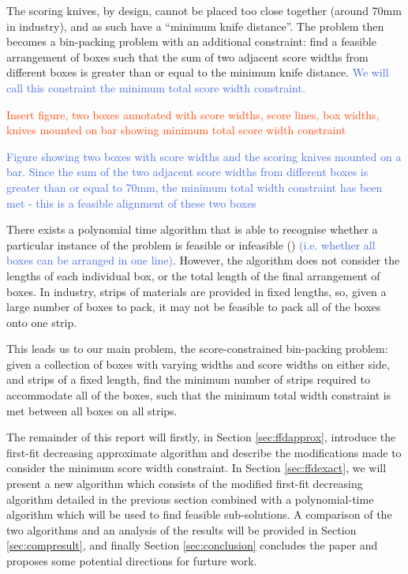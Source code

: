 \documentclass[oribibl]{llncs}
\begin{document}
The scoring knives, by design, cannot be placed too close together (around 70mm in industry), and as such have a ``minimum knife distance''. The problem then becomes a bin-packing problem with an additional constraint: find a feasible arrangement of boxes such that the sum of two adjacent score widths from different boxes is greater than or equal to the minimum knife distance. \textcolor{RoyalBlue}{We will call this constraint the minimum total score width constraint.}

\textcolor{OrangeRed}{Insert figure, two boxes annotated with score widths, score lines, box widths, knives mounted on bar showing minimum total score width constraint}

\textcolor{RoyalBlue}{Figure showing two boxes with score widths and the scoring knives mounted on a bar. Since the sum of the two adjacent score widths from different boxes is greater than or equal to 70mm, the minimum total width constraint has been met - this is a feasible alignment of these two boxes}

There exists a polynomial time algorithm that is able to recognise whether a particular instance of the problem is feasible or infeasible (\citealp{becker2010}) \textcolor{RoyalBlue}{(i.e. whether all boxes can be arranged in one line)}. However, the algorithm does not consider the lengths of each individual box, or the total length of the final arrangement of boxes. In industry, strips of materials are provided in fixed lengths, so, given a large number of boxes to pack, it may not be feasible to pack all of the boxes onto one strip. 

This leads us to our main problem, the score-constrained bin-packing problem: given a collection of boxes with varying widths and score widths on either side, and strips of a fixed length, find the minimum number of strips required to accommodate all of the boxes, such that the minimum total width constraint is met between all boxes on all strips. 

The remainder of this report will firstly, in Section \ref{sec:ffdapprox}, introduce the first-fit decreasing approximate algorithm and describe the modifications made to consider the minimum score width constraint. In Section \ref{sec:ffdexact}, we will present a new algorithm which consists of the modified first-fit decreasing algorithm detailed in the previous section combined with a polynomial-time algorithm which will be used to find feasible sub-solutions. A comparison of the two algorithms and an analysis of the results will be provided in Section \ref{sec:compresult}, and finally Section \ref{sec:conclusion} concludes the paper and proposes some potential directions for furture work.
\end{document}

